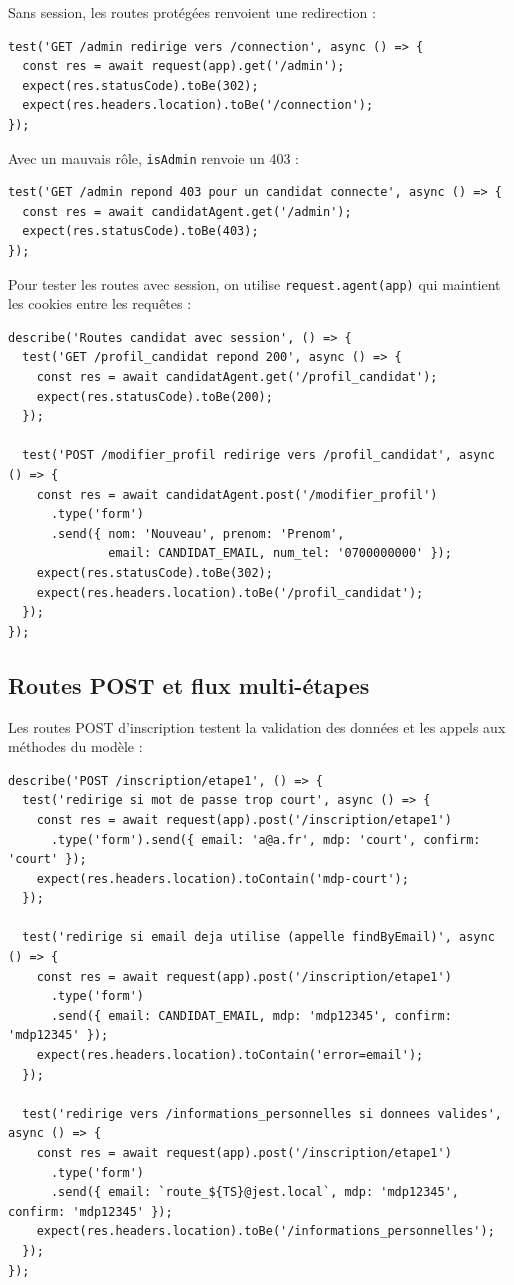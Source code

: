 \documentclass[12pt,a4paper]{article}
\begin{document}
Sans session, les routes protégées renvoient une redirection :

\begin{lstlisting}
test('GET /admin redirige vers /connection', async () => {
  const res = await request(app).get('/admin');
  expect(res.statusCode).toBe(302);
  expect(res.headers.location).toBe('/connection');
});
\end{lstlisting}

Avec un mauvais rôle, \texttt{isAdmin} renvoie un 403 :

\begin{lstlisting}
test('GET /admin repond 403 pour un candidat connecte', async () => {
  const res = await candidatAgent.get('/admin');
  expect(res.statusCode).toBe(403);
});
\end{lstlisting}

Pour tester les routes avec session, on utilise \texttt{request.agent(app)} qui maintient les cookies entre les requêtes :

\begin{lstlisting}
describe('Routes candidat avec session', () => {
  test('GET /profil_candidat repond 200', async () => {
    const res = await candidatAgent.get('/profil_candidat');
    expect(res.statusCode).toBe(200);
  });

  test('POST /modifier_profil redirige vers /profil_candidat', async () => {
    const res = await candidatAgent.post('/modifier_profil')
      .type('form')
      .send({ nom: 'Nouveau', prenom: 'Prenom',
              email: CANDIDAT_EMAIL, num_tel: '0700000000' });
    expect(res.statusCode).toBe(302);
    expect(res.headers.location).toBe('/profil_candidat');
  });
});
\end{lstlisting}

\subsection{Routes POST et flux multi-étapes}

Les routes POST d'inscription testent la validation des données et les appels aux méthodes du modèle :

\begin{lstlisting}
describe('POST /inscription/etape1', () => {
  test('redirige si mot de passe trop court', async () => {
    const res = await request(app).post('/inscription/etape1')
      .type('form').send({ email: 'a@a.fr', mdp: 'court', confirm: 'court' });
    expect(res.headers.location).toContain('mdp-court');
  });

  test('redirige si email deja utilise (appelle findByEmail)', async () => {
    const res = await request(app).post('/inscription/etape1')
      .type('form')
      .send({ email: CANDIDAT_EMAIL, mdp: 'mdp12345', confirm: 'mdp12345' });
    expect(res.headers.location).toContain('error=email');
  });

  test('redirige vers /informations_personnelles si donnees valides', async () => {
    const res = await request(app).post('/inscription/etape1')
      .type('form')
      .send({ email: `route_${TS}@jest.local`, mdp: 'mdp12345', confirm: 'mdp12345' });
    expect(res.headers.location).toBe('/informations_personnelles');
  });
});
\end{lstlisting}
\end{document}
